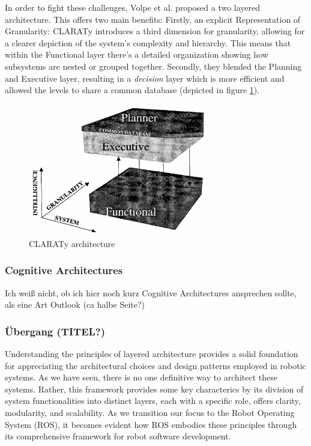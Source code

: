 \documentclass[]{article}
\begin{document}
	In order to fight these challenges, Volpe et al. proposed a two layered architecture. This offers two main benefits: \newline
	Firstly, an explicit Representation of Granularity: CLARATy introduces a third dimension for granularity, allowing for a clearer depiction of the system's complexity and hierarchy. This means that within the Functional layer there's a detailed organization showing how subsystems are nested or grouped together. Secondly, they blended the Planning and Executive layer, resulting in a \textit{decision} layer which is more efficient and allowed the levels to share a common database (depicted in figure \ref{fig: fig4}). \autocite{volpeCLARAtyArchitectureRobotic2001} 
	
	
	\begin{figure}[ht]
		\centering
		\includegraphics[width=0.7\textwidth]{Graphics/CLARATy}
		\caption{CLARATy architecture \autocite{volpeCLARAtyArchitectureRobotic2001} }
		\label{fig: fig4}
	\end{figure} 
	
	\newpage
	
	\subsubsection{Cognitive Architectures}
	{\color{red} Ich weiß nicht, ob ich hier noch kurz Cognitive Architectures ansprechen sollte, als eine Art Outlook (ca halbe Seite?)}
	
	
	\subsubsection{Übergang (TITEL?)}
	Understanding the principles of layered architecture provides a solid foundation for appreciating the architectural choices and design patterns employed in robotic systems. As we have seen, there is no one definitive way to architect these systems. Rather, this framework provides some key characterics by its division of system functionalities into distinct layers, each with a specific role, offers clarity, modularity, and scalability. As we transition our focus to the Robot Operating System (ROS), it becomes evident how ROS embodies these principles through its comprehensive framework for robot software development.
	
\end{document}
